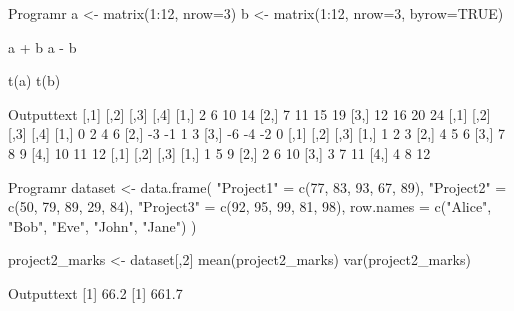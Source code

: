 \documentclass[11pt]{ipu-r}
\begin{document}
    \begin{code}
        {Program}{r}
a <- matrix(1:12, nrow=3)
b <- matrix(1:12, nrow=3, byrow=TRUE)

a + b
a - b

t(a)
t(b)
    \end{code}
    \newpage
    \vspace*{-10pt}
    \begin{code}
        {Output}{text}
     [,1] [,2] [,3] [,4]
[1,]    2    6   10   14
[2,]    7   11   15   19
[3,]   12   16   20   24
     [,1] [,2] [,3] [,4]
[1,]    0    2    4    6
[2,]   -3   -1    1    3
[3,]   -6   -4   -2    0
     [,1] [,2] [,3]
[1,]    1    2    3
[2,]    4    5    6
[3,]    7    8    9
[4,]   10   11   12
     [,1] [,2] [,3]
[1,]    1    5    9
[2,]    2    6   10
[3,]    3    7   11
[4,]    4    8   12
    \end{code}

    \begin{code}
        {Program}{r}
dataset <- data.frame(
  "Project1" = c(77, 83, 93, 67, 89),
  "Project2" = c(50, 79, 89, 29, 84),
  "Project3" = c(92, 95, 99, 81, 98),
  row.names = c("Alice", "Bob", "Eve", "John", "Jane")
)

project2_marks <- dataset[,2]
mean(project2_marks)
var(project2_marks)
    \end{code}
    \begin{code}
        {Output}{text}
[1] 66.2
[1] 661.7
    \end{code}
\end{document}
